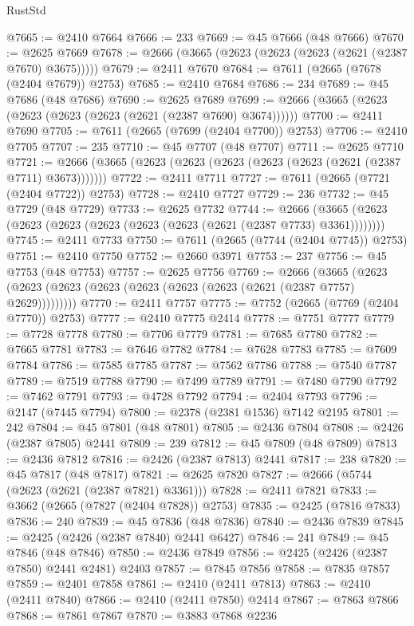 \begin{lexlean}{RustStd}
\begin{coremodule}
@7665 := @2410 @7664
@7666 := 233
@7669 := @45 @7666 (@48 @7666)
@7670 := @2625 @7669
@7678 := @2666 (@3665 (@2623 (@2623 (@2623 (@2621 (@2387 @7670) @3675)))))
@7679 := @2411 @7670
@7684 := @7611 (@2665 (@7678 (@2404 @7679)) @2753)
@7685 := @2410 @7684
@7686 := 234
@7689 := @45 @7686 (@48 @7686)
@7690 := @2625 @7689
@7699 := @2666 (@3665 (@2623 (@2623 (@2623 (@2623 (@2621 (@2387 @7690) @3674))))))
@7700 := @2411 @7690
@7705 := @7611 (@2665 (@7699 (@2404 @7700)) @2753)
@7706 := @2410 @7705
@7707 := 235
@7710 := @45 @7707 (@48 @7707)
@7711 := @2625 @7710
@7721 := @2666 (@3665 (@2623 (@2623 (@2623 (@2623 (@2623 (@2621 (@2387 @7711) @3673)))))))
@7722 := @2411 @7711
@7727 := @7611 (@2665 (@7721 (@2404 @7722)) @2753)
@7728 := @2410 @7727
@7729 := 236
@7732 := @45 @7729 (@48 @7729)
@7733 := @2625 @7732
@7744 := @2666 (@3665 (@2623 (@2623 (@2623 (@2623 (@2623 (@2623 (@2621 (@2387 @7733) @3361))))))))
@7745 := @2411 @7733
@7750 := @7611 (@2665 (@7744 (@2404 @7745)) @2753)
@7751 := @2410 @7750
@7752 := @2660 @3971
@7753 := 237
@7756 := @45 @7753 (@48 @7753)
@7757 := @2625 @7756
@7769 := @2666
    (@3665 (@2623 (@2623 (@2623 (@2623 (@2623 (@2623 (@2623 (@2621 (@2387 @7757) @2629)))))))))
@7770 := @2411 @7757
@7775 := @7752 (@2665 (@7769 (@2404 @7770)) @2753)
@7777 := @2410 @7775 @2414
@7778 := @7751 @7777
@7779 := @7728 @7778
@7780 := @7706 @7779
@7781 := @7685 @7780
@7782 := @7665 @7781
@7783 := @7646 @7782
@7784 := @7628 @7783
@7785 := @7609 @7784
@7786 := @7585 @7785
@7787 := @7562 @7786
@7788 := @7540 @7787
@7789 := @7519 @7788
@7790 := @7499 @7789
@7791 := @7480 @7790
@7792 := @7462 @7791
@7793 := @4728 @7792
@7794 := @2404 @7793
@7796 := @2147 (@7445 @7794)
@7800 := @2378 (@2381 @1536) @7142 @2195
@7801 := 242
@7804 := @45 @7801 (@48 @7801)
@7805 := @2436 @7804
@7808 := @2426 (@2387 @7805) @2441
@7809 := 239
@7812 := @45 @7809 (@48 @7809)
@7813 := @2436 @7812
@7816 := @2426 (@2387 @7813) @2441
@7817 := 238
@7820 := @45 @7817 (@48 @7817)
@7821 := @2625 @7820
@7827 := @2666 (@5744 (@2623 (@2621 (@2387 @7821) @3361)))
@7828 := @2411 @7821
@7833 := @3662 (@2665 (@7827 (@2404 @7828)) @2753)
@7835 := @2425 (@7816 @7833)
@7836 := 240
@7839 := @45 @7836 (@48 @7836)
@7840 := @2436 @7839
@7845 := @2425 (@2426 (@2387 @7840) @2441 @6427)
@7846 := 241
@7849 := @45 @7846 (@48 @7846)
@7850 := @2436 @7849
@7856 := @2425 (@2426 (@2387 @7850) @2441 @2481) @2403
@7857 := @7845 @7856
@7858 := @7835 @7857
@7859 := @2401 @7858
@7861 := @2410 (@2411 @7813)
@7863 := @2410 (@2411 @7840)
@7866 := @2410 (@2411 @7850) @2414
@7867 := @7863 @7866
@7868 := @7861 @7867
@7870 := @3883 @7868 @2236

\end{coremodule}
\end{lexlean}
